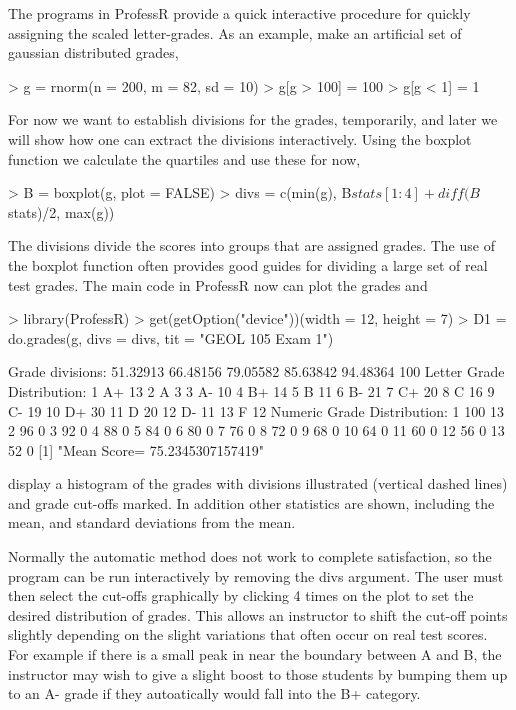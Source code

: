 \documentclass{article}
\begin{document}
The programs in ProfessR provide a quick interactive 
procedure for quickly assigning the scaled letter-grades.
As an example,  make an artificial set of gaussian distributed grades,
\begin{Schunk}
\begin{Sinput}
> g = rnorm(n = 200, m = 82, sd = 10)
> g[g > 100] = 100
> g[g < 1] = 1
\end{Sinput}
\end{Schunk}

For now we want to establish divisions for
the grades, temporarily, and later we will show how
one can extract the divisions interactively.
Using the boxplot function we calculate the quartiles
and use these for now,
\begin{Schunk}
\begin{Sinput}
> B = boxplot(g, plot = FALSE)
> divs = c(min(g), B$stats[1:4] + diff(B$stats)/2, max(g))
\end{Sinput}
\end{Schunk}
The divisions divide the scores
into groups that are assigned grades.
The use of the boxplot function often provides good 
guides for dividing a large set of 
real test grades.
The main code in ProfessR now can plot the grades and
\begin{Schunk}
\begin{Sinput}
> library(ProfessR)
> get(getOption("device"))(width = 12, height = 7)
> D1 = do.grades(g, divs = divs, tit = "GEOL 105 Exam 1")
\end{Sinput}
\begin{Soutput}
Grade divisions:
51.32913
66.48156
79.05582
85.63842
94.48364
100
Letter Grade Distribution:
1 A+ 13
2 A 3
3 A- 10
4 B+ 14
5 B 11
6 B- 21
7 C+ 20
8 C 16
9 C- 19
10 D+ 30
11 D 20
12 D- 11
13 F 12
Numeric Grade Distribution:
1 100 13
2 96 0
3 92 0
4 88 0
5 84 0
6 80 0
7 76 0
8 72 0
9 68 0
10 64 0
11 60 0
12 56 0
13 52 0
[1] "Mean Score= 75.2345307157419"
\end{Soutput}
\end{Schunk}
display a histogram of the grades with divisions
illustrated (vertical dashed lines)  and grade  cut-offs marked.
In addition other statistics are shown, including the mean,
and standard deviations from the mean.

Normally the automatic method does not work to complete satisfaction,
so the program can be run interactively by 
removing the  divs argument.
The user must then
select the cut-offs graphically by clicking 4 times on the
plot to set  the desired distribution of grades.
This allows an instructor to shift the
cut-off points slightly depending on
the slight variations that often occur on real test scores.
For example if there is 
a small peak in near the boundary between A and B,
the instructor may wish to give a slight boost
to those students by bumping them up to an A- grade
if they autoatically would fall into the B+ category.
\end{document}
